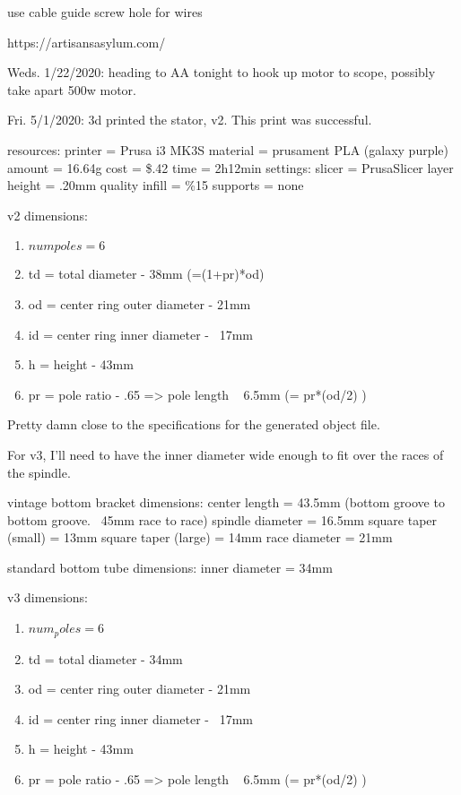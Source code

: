 \documentclass[11pt]{article} %
\begin{document}
use cable guide screw hole for wires 

https://artisansasylum.com/




Weds. 1/22/2020: heading to AA tonight to hook up motor to scope, possibly take apart 500w motor.

Fri. 5/1/2020: 3d printed the stator, v2. This print was successful.

resources:
printer = Prusa i3 MK3S
material = prusament PLA (galaxy purple)
amount = 16.64g
cost = \$.42
time = 2h12min
settings:
slicer = PrusaSlicer
layer height = .20mm quality
infill = \%15
supports = none




v2 dimensions:
\begin{enumerate}
\item $num poles = 6$
\item td = total diameter - 38mm (=(1+pr)*od)
\item od = center ring outer diameter - 21mm
\item id = center ring inner diameter - ~17mm
\item h = height - 43mm
\item pr = pole ratio - .65 => pole length ~ 6.5mm (= pr*(od/2) )
\end{enumerate}



Pretty damn close to the specifications for the generated object file.

For v3, I’ll need to have the inner diameter wide enough to fit over the races of the spindle.

vintage bottom bracket dimensions:
center length = 43.5mm (bottom groove to bottom groove. ~45mm race to race)
spindle diameter = 16.5mm
square taper (small) = 13mm
square taper (large) = 14mm
race diameter = 21mm

standard bottom tube dimensions:
inner diameter = 34mm



v3 dimensions:
\begin{enumerate}
\item $num_poles = 6$
\item td = total diameter - 34mm
\item od = center ring outer diameter - 21mm
\item id = center ring inner diameter - ~17mm
\item h = height - 43mm
\item pr = pole ratio - .65 => pole length ~ 6.5mm (= pr*(od/2) )
\end{enumerate}
\end{document}
